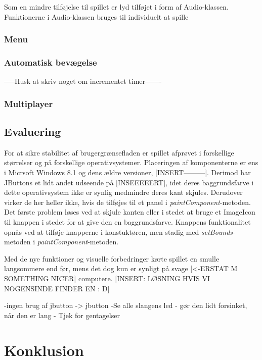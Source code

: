 \documentclass{report}
\begin{document}
Som en mindre tilføjelse til spillet er lyd tilføjet i form af Audio-klassen. Funktionerne i Audio-klassen bruges til individuelt at spille 	


\subsection{Menu}

\subsection{Automatisk bevægelse}
-----Husk at skriv noget om incrementet timer-------

\subsection{Multiplayer}

\section{Evaluering}
For at sikre stabilitet af brugergrænsefladen er spillet afprøvet i forskellige størrelser og på forskellige operativsystemer. Placeringen af komponenterne er ens i Micrsoft Windows 8.1 og dens ældre versioner, [INSERT---------]. Derimod har JButtons et lidt andet udseende på [INSEEEEERT], idet deres baggrundsfarve i dette operativsystem ikke er synlig medmindre deres kant skjules. Derudover virker de her heller ikke, hvis de tilføjes til et panel i \textit{paintComponent}-metoden. Det første problem løses ved at skjule kanten eller i stedet at bruge et ImageIcon til knappen i stedet for at give den en baggrundsfarve. Knappens funktionalitet opnås ved at tilføje knapperne i konstuktøren, men stadig med \textit{setBounds}-metoden i \textit{paintComponent}-metoden. 

Med de nye funktioner og visuelle forbedringer kørte spillet en smulle langsommere end før, mens det dog kun er synligt på svage [<-ERSTAT M SOMETHING NICER] computere. [INSERT: LØSNING HVIS VI NOGENSINDE FINDER EN : D]

-ingen brug af jbutton -> jbutton
-Se alle slangens led - gør den lidt forsinket, når den er lang
- Tjek for gentagelser



\chapter{Konklusion}
\end{document}

